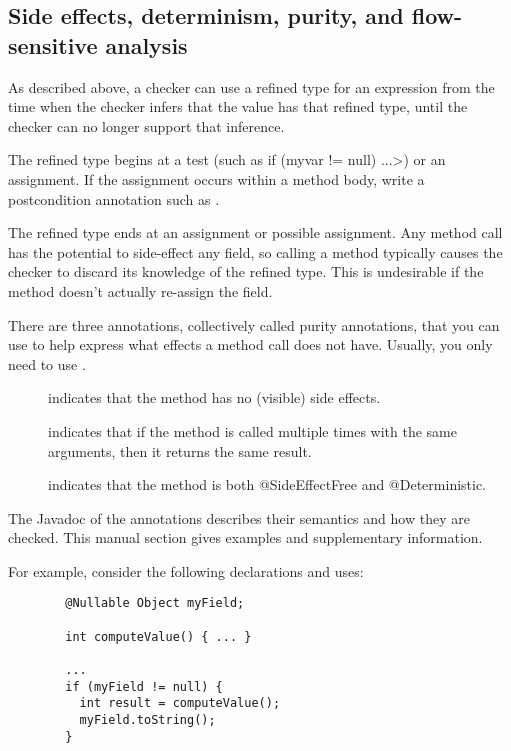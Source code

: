 \subsection{Side effects, determinism, purity, and flow-sensitive analysis\label{type-refinement-purity}}

As described above, a checker can use a refined type for an expression from
the time when the checker infers that the value has that refined type,
until the checker can no longer support that inference.

The refined type begins at a test (such as \<if (myvar != null) ...>) or
an assignment.  If the assignment occurs within a method body,
write a postcondition annotation such as
.

The refined type ends at an assignment or possible assignment.  Any method
call has the potential to side-effect any field, so calling a method
typically causes the checker to discard its knowledge of the refined type.
This is undesirable if the method doesn't actually re-assign the field.

There are three annotations, collectively called purity annotations, that
you can use to help express what effects a method call does not have.
Usually, you only need to use .


\begin{description}

\item[]
  indicates that the method has no (visible) side effects.

\item[]
  indicates that if the method is called multiple times with the same
  arguments, then it returns the same result.

\item[]
  indicates that the method is both @SideEffectFree and @Deterministic.

\end{description}

The Javadoc of the annotations describes their semantics and how they are
checked.  This manual section gives examples and supplementary information.

For example, consider the
following declarations and uses:

\begin{Verbatim}
        @Nullable Object myField;

        int computeValue() { ... }

        ...
        if (myField != null) {
          int result = computeValue();
          myField.toString();
        }
\end{Verbatim}

